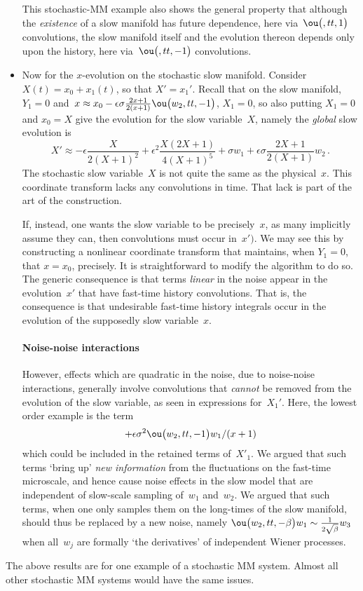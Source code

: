\begin{itemize}
\begin{itemize}
\end{itemize}
This stochastic-MM example also shows the general property
that although the \emph{existence} of a slow manifold has
future dependence, here via~\(\ou\big({},tt,1\big)\)
convolutions, the slow manifold itself and the evolution
thereon depends only upon the history, here
via~\(\ou\big({},tt,-1\big)\) convolutions.

\item Now for the \(x\)-evolution on the stochastic slow
manifold. Consider \(X(t)=x_0+x_1(t)\), so that \(X'=x_1'\).
Recall that on the slow manifold, \(Y_1=0\) and~\(x\approx
x_0-\epsilon  \sigma \frac {2x+1} {2(x+1)}
\ou\big(w_{2},tt,-1\big)\), \(X_1=0\), so also putting
\(X_1=0\) and \(x_0=X\) give the evolution for the slow
variable~\(X\), namely the \emph{global} slow evolution is
\begin{equation*}
X'\approx -\epsilon \frac{X}{2(X+1)^2} +\epsilon^2
\frac{X(2X+1)}{4(X+1)^ 5} +\sigma w_1 +\epsilon \sigma
\frac{2X+1}{2(X+1)}w_2\,.
\end{equation*}
The stochastic slow variable~\(X\) is not quite the same as
the physical~\(x\). This coordinate transform lacks any
convolutions in time. That lack is part of the art of the
construction.

If, instead, one wants the slow variable to be
precisely~\(x\), as many implicitly assume they can, then
convolutions must occur in~\(x')\). We may see this by
constructing a nonlinear coordinate transform that
maintains, when \(Y_1=0\), that \(x=x_0\), precisely.  It is
straightforward to modify the algorithm to do so.  The
generic consequence is that terms \emph{linear} in the noise
appear in the evolution~\(x'\) that have fast-time history
convolutions. That is, the consequence is that undesirable
fast-time history integrals occur in the evolution of the
supposedly slow variable~\(x\).



\paragraph{Noise-noise interactions}
However, effects which are quadratic in the noise, due to
noise-noise interactions, generally involve convolutions
that \emph{cannot} be removed from the evolution of the slow
variable, as seen in expressions for~\(X_1'\). Here, the
lowest order example is the term
\begin{equation*}
+\epsilon  \sigma ^{2} \ou\big(w_{2},tt,-1\big) w_{1} /(x+1)
\end{equation*}
which could be included in the retained terms of~\(X'_1\).
We argued \cite[\S4]{Chao95} that such terms `bring up'
\emph{new information} from the fluctuations on the
fast-time microscale, and hence cause noise effects in the
slow model that are independent of slow-scale sampling
of~\(w_1\) and~\(w_2\). We argued that such terms, when one
only samples them on the long-times of the slow manifold,
should thus be replaced by a new noise, namely
\(\ou\big(w_{2},tt,-\beta\big)
w_{1}\sim\frac1{2\sqrt\beta}w_3\) when all~\(w_j\) are
formally `the derivatives' of independent Wiener processes.

\end{itemize}

The above results are for one example of a stochastic MM
system.  Almost all other stochastic MM systems would have
the same issues.



